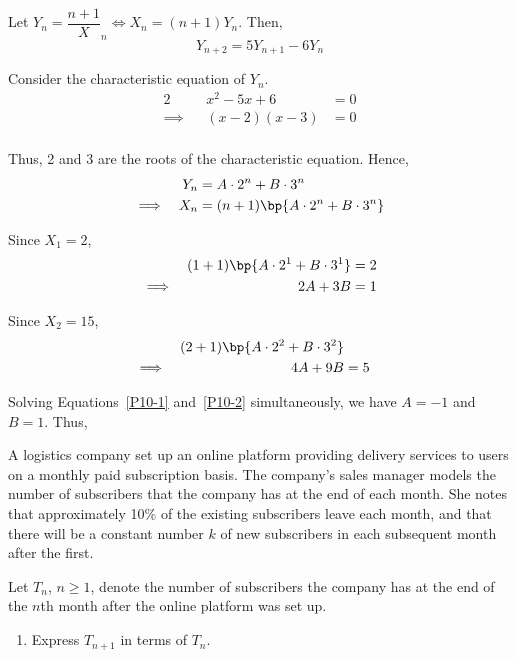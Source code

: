\documentclass{echw}
\begin{document}
        Let $Y_n = \dfrac{n + 1}X_n \iff X_n = (n+1)Y_n$. Then,
        \[
            Y_{n+2} = 5 Y_{n+1} - 6Y_n
        \]

        Consider the characteristic equation of $Y_n$.
        \begin{alignat*}{2}
            &&x^2 - 5x + 6 &= 0\\
            \implies&&(x-2)(x-3) &= 0\\
        \end{alignat*}

        Thus, 2 and 3 are the roots of the characteristic equation. Hence,
        \begin{alignat*}{2}
            &&Y_n &= A \cdot 2^n + B \cdot 3^n\\
            \implies&&X_n &= (n+1)\bp{A \cdot 2^n + B \cdot 3^n}
        \end{alignat*}

        Since $X_1 = 2$,
        \begin{alignat}{2}
            &&(1+1)\bp{A \cdot 2^1 + B \cdot 3^1} &= 2\nonumber\\
            \implies&&2A + 3B &= 1\label{P10-1}
        \end{alignat}

        Since $X_2 = 15$,
        \begin{alignat}{2}
            &&(2+1)\bp{A \cdot 2^2 + B \cdot 3^2}\nonumber\\
            \implies&&4A + 9B &= 5\label{P10-2}
        \end{alignat}

        Solving Equations~\ref{P10-1} and~\ref{P10-2} simultaneously, we have $A = -1$ and $B = 1$. Thus,


    \problem{}
        A logistics company set up an online platform providing delivery services to users on a monthly paid subscription basis. The company's sales manager models the number of subscribers that the company has at the end of each month. She notes that approximately 10\% of the existing subscribers leave each month, and that there will be a constant number $k$ of new subscribers in each subsequent month after the first.

        Let $T_n$, $n \geq 1$, denote the number of subscribers the company has at the end of the $n$th month after the online platform was set up.

        \begin{enumerate}
            \item Express $T_{n+1}$ in terms of $T_n$.
        \end{enumerate}
\end{document}
